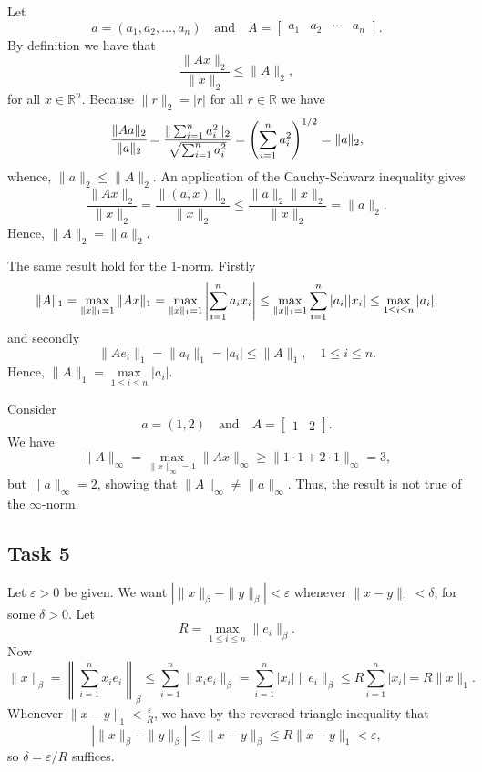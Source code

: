 \documentclass[a4paper,12pt]{article}
\begin{document}
Let
\[
  a = (a_1, a_2, \dots, a_n)
  \quad \text{and} \quad
  A =
    \begin{bmatrix}
      a_1 & a_2 & \cdots & a_n
    \end{bmatrix}.
\]
By definition we have that
\[ \frac{\|Ax\|_2}{\|x\|_2} \le \|A\|_2, \]
for all \(x\in \mathbb{R}^n\).
Because \(\|r\|_2 = |r|\) for all \(r \in \mathbb{R}\) we have
\[
  \cfrac{\|Aa\|_2}{\|a\|_2}
    = \frac{\|\sum_{i=1}^n a_i^2\|_2}{\sqrt{\sum_{i=1}^n a_i^2}}
    = \left(\sum_{i=1}^{n} a_i^2\right)^{1/2}
    = \|a\|_2,
\]
whence, \(\|a\|_2\le \|A\|_2\).
An application of the Cauchy-Schwarz inequality gives
\[
  \frac{\|Ax\|_2}{\|x\|_2}
    = \frac{\|(a,x)\|_2}{\|x\|_2}
    \le \frac{\|a\|_2 \|x\|_2}{\|x\|_2}
    = \|a\|_2.
\]
Hence, \(\|A\|_2= \|a\|_2\).

The same result hold for the 1-norm.
Firstly
\[
  \|A\|_1
    = \max_{\|x\|_1 = 1} \|Ax\|_1\\
    = \max_{\|x\|_1 = 1} \left| \sum_{i=1}^n a_i x_i\right|
    \le \max_{\|x\|_1 = 1} \sum_{i=1}^n |a_i||x_i|
    \le \max_{1 \le i \le n} |a_i|,
\]
and secondly
\[ \|Ae_i\|_1 = \|a_i\|_1 = |a_i| \le \|A\|_1, \quad 1 \le i \le n. \]
Hence, $ \|A\|_1=\underset{1\le i \le n}{\max} |a_i|$.

Consider
\[
  a = (1, 2)
  \quad \text{and} \quad
  A =
    \begin{bmatrix}
      1 & 2
    \end{bmatrix}.
\]
We have
\[
  \|A\|_\infty
    = \max_{\|x\|_\infty = 1} \|Ax\|_\infty
    \ge \|1 \cdot 1 + 2 \cdot 1\|_\infty
    = 3,
\]
but \(\|a\|_\infty = 2\), showing that \(\|A\|_\infty \ne
\|a\|_\infty\).
Thus, the result is not true of the \(\infty\)-norm.


\subsection*{Task 5}

Let \(\varepsilon > 0\) be given.
We want \(\left|\|x\|_\beta - \|y\|_\beta\right| < \varepsilon\)
whenever \(\|x-y\|_1 < \delta\), for some \(\delta > 0\).
Let
\[ R = \max_{1 \le i \le n} \|e_i\|_\beta. \]
Now
\[
  \|x\|_\beta
    = \left\|\sum_{i=1}^n x_i e_i\right\|_\beta
    \le \sum_{i=1}^n \|x_i e_i\|_\beta
    = \sum_{i=1}^n |x_i| \|e_i\|_\beta
    \le R \sum_{i=1}^n |x_i|
    = R \|x\|_1.
\]
Whenever \(\|x-y\|_1 < \frac{\varepsilon}{R}\), we have by the reversed
triangle inequality that
\[
  \left|\|x\|_\beta - \|y\|_\beta\right|
    \le \|x - y\|_\beta
    \le R \|x - y\|_1
    < \varepsilon,
\]
so \(\delta = \varepsilon/R\) suffices.
\end{document}
